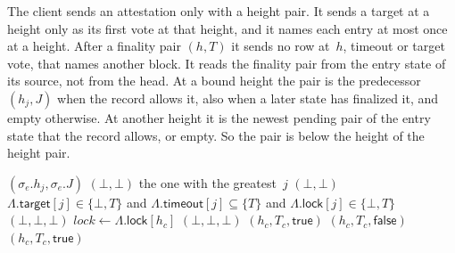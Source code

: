 The client sends an attestation only with a height pair.  It sends a
target at a height only as its first vote at that height, and it names
each entry at most once at a height.  After a finality pair $(h,T)$ it
sends no row at~$h$, timeout or target vote, that names another block.
It reads the finality pair from the entry state of its source, not from
the head.  At a bound height the
pair is the predecessor $(h_j,J)$ when the record allows it, also when a
later state has finalized it, and empty otherwise.  At another height it
is the newest pending pair of the entry state that the record allows, or
empty.  So the pair is below the height of the height pair.

\label{alg:attn-full}
\nopagebreak
{\footnotesize
\begin{algorithmic}[1]
      \State \Return $(\sigma_e.h_j,\sigma_e.J)$
    \EndIf
    \State \Return $(\bot,\bot)$
  \EndIf
    \State \Return the one with the greatest~$j$
  \EndIf
  \State \Return $(\bot,\bot)$
\EndFunction
\vspace{1pt}
  \State \Return $\Lambda.\mathsf{target}[j]\in\{\bot,T\}$ and
    $\Lambda.\mathsf{timeout}[j]\subseteq\{T\}$ and
    $\Lambda.\mathsf{lock}[j]\in\{\bot,T\}$
\EndFunction
\vspace{1pt}
   \State \Return $(\bot,\bot,\bot)$ \EndIf
  \State $\mathit{lock}\gets\Lambda.\mathsf{lock}[h_c]$
    \State \Return $(\bot,\bot,\bot)$
  \EndIf
    \State \Return $(h_c,T_c,\mathsf{true})$
  \EndIf
    \State \Return $(h_c,T_c,\mathsf{false})$
  \EndIf
  \State \Return $(h_c,T_c,\mathsf{true})$
\EndFunction
\vspace{1pt}

\end{algorithmic}}
